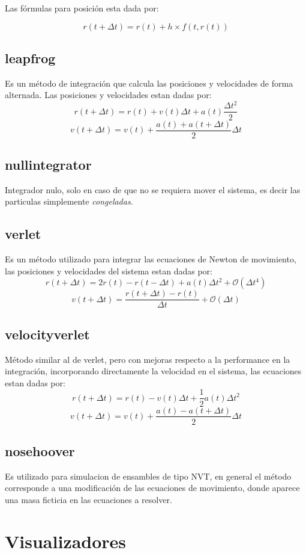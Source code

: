 Las f\'ormulas para posici\'on esta dada por:

$$r(t+\Delta t) = r(t) + h\times f(t,r(t))$$

\subsection{leapfrog}
Es un m\'etodo de integraci\'on que calcula las posiciones y velocidades de forma alternada. Las posiciones y velocidades estan dadas por:
$$r(t+\Delta t) = r(t) + v(t)\Delta t + a(t)\frac{\Delta t^2}{2}$$
$$v(t+\Delta t) = v(t) + \frac{a(t)+a(t+\Delta t)}{2}\Delta t$$
\subsection{nullintegrator}
Integrador nulo, solo en caso de que no se requiera mover el sistema, es decir las particulas simplemente \textit{congeladas}.
\subsection{verlet}
Es un m\'etodo utilizado para integrar las ecuaciones de Newton de movimiento, las posiciones y velocidades del sistema estan dadas por:
$$r(t+\Delta t) = 2r(t) - r(t-\Delta t) + a(t)\Delta t^2 + \mathcal{O}(\Delta t^4)$$
$$v(t+\Delta t) = \frac{r(t+\Delta t) - r(t)}{\Delta t} + \mathcal{O}(\Delta t)$$
\subsection{velocityverlet}
M\'etodo similar al de verlet, pero con mejoras respecto a la performance en la integraci\'on, incorporando directamente la velocidad en el sistema, las ecuaciones estan dadas por:
$$r(t+\Delta t) = r(t) - v(t)\Delta t + \frac{1}{2}a(t)\Delta t^2$$
$$v(t+\Delta t) = v(t) + \frac{a(t) - a(t + \Delta t)}{2}\Delta t$$
\subsection{nosehoover}
Es utilizado para simulacion de ensambles de tipo NVT, en general el m\'etodo corresponde a una modificaci\'on de las ecuaciones de movimiento, donde aparece una masa ficticia en las ecuaciones a resolver.

\section{Visualizadores}
